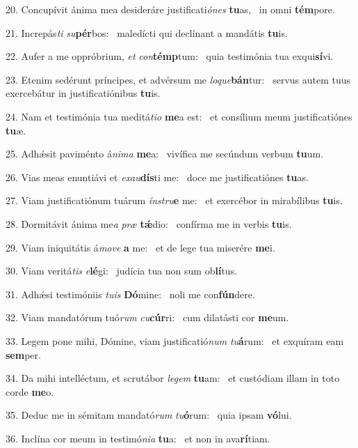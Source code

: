 20. Concupívit ánima mea desideráre justificati\textit{ó}\textit{nes} \textbf{tu}as, \ast\  in omni \textbf{tém}pore.\

21. Increpás\textit{ti} \textit{su}\textbf{pér}bos: \ast\  maledícti qui declínant a mandátis \textbf{tu}is.\

22. Aufer a me oppróbrium, \textit{et} \textit{con}\textbf{témp}tum: \ast\  quia testimónia tua exqui\textbf{sí}vi.\

23. Etenim sedérunt príncipes, et advérsum me \textit{lo}\textit{que}\textbf{bán}tur: \ast\  servus autem tuus exercebátur in justificatiónibus \textbf{tu}is.\

24. Nam et testimónia tua meditá\textit{ti}\textit{o} \textbf{me}a est: \ast\  et consílium meum justificatiónes \textbf{tu}æ.\

25. Adhǽsit paviménto á\textit{ni}\textit{ma} \textbf{me}a: \ast\  vivífica me secúndum verbum \textbf{tu}um.\

26. Vias meas enuntiávi et \textit{ex}\textit{au}\textbf{dís}ti me: \ast\  doce me justificatiónes \textbf{tu}as.\

27. Viam justificatiónum tuárum \textit{ín}\textit{stru}\textbf{e} me: \ast\  et exercébor in mirabílibus \textbf{tu}is.\

28. Dormitávit ánima me\textit{a} \textit{præ} \textbf{tǽ}dio: \ast\  confírma me in verbis \textbf{tu}is.\

29. Viam iniquitátis á\textit{mo}\textit{ve} \textbf{a} me: \ast\  et de lege tua miserére \textbf{me}i.\

30. Viam veritá\textit{tis} \textit{e}\textbf{lé}gi: \ast\  judícia tua non sum ob\textbf{lí}tus.\

31. Adhǽsi testimóniis \textit{tu}\textit{is} \textbf{Dó}mine: \ast\  noli me con\textbf{fún}dere.\

32. Viam mandatórum tuó\textit{rum} \textit{cu}\textbf{cúr}ri: \ast\  cum dilatásti cor \textbf{me}um.\

33. Legem pone mihi, Dómine, viam justificatió\textit{num} \textit{tu}\textbf{á}rum: \ast\  et exquíram eam \textbf{sem}per.\

34. Da mihi intelléctum, et scrutábor \textit{le}\textit{gem} \textbf{tu}am: \ast\  et custódiam illam in toto corde \textbf{me}o.\

35. Deduc me in sémitam mandató\textit{rum} \textit{tu}\textbf{ó}rum: \ast\  quia ipsam \textbf{vó}lui.\

36. Inclína cor meum in testimó\textit{ni}\textit{a} \textbf{tu}a: \ast\  et non in ava\textbf{rí}tiam.\

